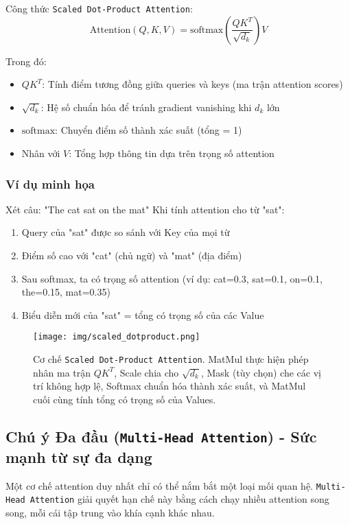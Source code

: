Công thức \texttt{Scaled Dot-Product Attention}:
$$ \text{Attention}(Q, K, V) = \text{softmax}\left(\frac{QK^T}{\sqrt{d_k}}\right)V $$

Trong đó:
\begin{itemize}
    \item $QK^T$: Tính điểm tương đồng giữa queries và keys (ma trận attention scores)
    \item $\sqrt{d_k}$: Hệ số chuẩn hóa để tránh gradient vanishing khi $d_k$ lớn
    \item $\text{softmax}$: Chuyển điểm số thành xác suất (tổng = 1)
    \item Nhân với $V$: Tổng hợp thông tin dựa trên trọng số attention
\end{itemize}

\subsubsection{Ví dụ minh họa}
Xét câu: "The cat sat on the mat"
Khi tính attention cho từ "sat":
\begin{enumerate}
    \item Query của "sat" được so sánh
    với Key của mọi từ
    \item Điểm số cao với "cat" (chủ ngữ) và "mat" (địa điểm)
    \item Sau softmax, ta có trọng số attention (ví dụ: cat=0.3, sat=0.1, on=0.1, the=0.15, mat=0.35)
    \item Biểu diễn mới của "sat" = tổng có trọng số của các Value
\end{enumerate}

\begin{figure}[H]
    \centering
    \texttt{[image: img/scaled\_dotproduct.png]}
    \caption{Cơ chế \texttt{Scaled Dot-Product Attention}.
    MatMul thực hiện phép nhân ma trận $QK^T$, Scale chia cho $\sqrt{d_k}$, Mask (tùy chọn) che các vị trí không hợp lệ, Softmax chuẩn hóa thành xác suất, và MatMul cuối cùng tính tổng có trọng số của Values.}
    \label{fig:scaled_dot_product_attention}
\end{figure}

\subsection{Chú ý Đa đầu (\texttt{Multi-Head Attention}) - Sức mạnh từ sự đa dạng}
\label{ssec:multi_head_attention}
Một cơ chế attention duy nhất chỉ có thể nắm bắt một loại mối quan hệ.
\texttt{Multi-Head Attention} giải quyết hạn chế này bằng cách chạy nhiều attention song song, mỗi cái tập trung vào khía cạnh khác nhau.
